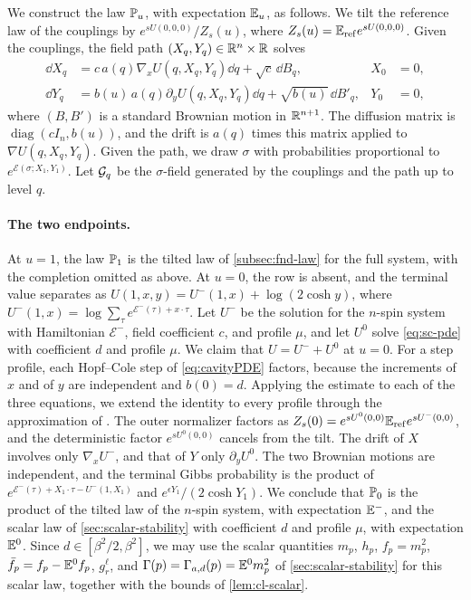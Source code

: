 We construct the law $\mathbb P_u$, with expectation $\mathbb E_u$, as follows. We
tilt the reference law of the couplings by $e^{sU(0,0,0)}/Z_s(u)$,
where $Z_s(u)=\mathbb E_{\rm ref}e^{sU(0,0,0)}$. Given the couplings, the field
path $(X_q,Y_q)\in\mathbb R^n\times\mathbb R$ solves
\[
 \begin{aligned}
 \dd X_q&=c\,a(q)\nabla_xU(q,X_q,Y_q)\dd q+\sqrt c\,\dd B_q,
 &X_0&=0,\\
 \dd Y_q&=b(u)\,a(q)\partial_yU(q,X_q,Y_q)\dd q+\sqrt{b(u)}\,\dd B'_q,
 &Y_0&=0,
 \end{aligned}
\]
where $(B,B')$ is a standard Brownian motion in $\mathbb R^{n+1}$. The diffusion
matrix is $\operatorname{diag}(cI_n,b(u))$, and the drift is $a(q)$
times this matrix applied to $\nabla U(q,X_q,Y_q)$. Given the path,
we draw $\sigma$ with probabilities proportional to
$e^{\mathcal E(\sigma;X_1,Y_1)}$. Let $\mathcal G_q$ be the $\sigma$-field
generated by the couplings and the path up to level $q$.

\paragraph{The two endpoints.}
At $u=1$, the law $\mathbb P_1$ is the tilted law of \cref{subsec:fnd-law} for
the full system, with the completion omitted as above. At $u=0$, the row
is absent, and the terminal value separates as
$U(1,x,y)=U^-(1,x)+\log(2\cosh y)$, where
$U^-(1,x)=\log\sum_\tau e^{\mathcal E^-(\tau)+x\cdot\tau}$. Let $U^-$ be
the solution for the $n$-spin system with Hamiltonian $\mathcal E^-$,
field coefficient $c$, and profile $\mu$, and let $U^0$ solve
\eqref{eq:sc-pde} with coefficient $d$ and profile $\mu$. We claim that
$U=U^-+U^0$ at $u=0$. For a step profile, each Hopf--Cole step of
\eqref{eq:cavityPDE} factors, because the increments of $x$ and of $y$
are independent and $b(0)=d$. Applying the estimate \cite[(2.19)]{AL} to
each of the three equations, we extend the identity to every profile
through the approximation of \cite[Section~2.6]{AL}. The outer normalizer
factors as $Z_s(0)=e^{sU^0(0,0)}\mathbb E_{\rm ref}e^{sU^-(0,0)}$, and the
deterministic factor $e^{sU^0(0,0)}$ cancels from the tilt. The drift of
$X$ involves only $\nabla_xU^-$, and that of $Y$ only $\partial_yU^0$.
The two Brownian motions are independent, and the terminal Gibbs
probability is the product of
$e^{\mathcal E^-(\tau)+X_1\cdot\tau-U^-(1,X_1)}$ and
$e^{\epsilon Y_1}/(2\cosh Y_1)$. We conclude that $\mathbb P_0$ is the product
of the tilted law of the $n$-spin system, with expectation $\mathbb E^-$, and
the scalar law of \cref{sec:scalar-stability} with coefficient $d$ and
profile $\mu$, with expectation $\mathbb E^0$. Since $d\in[\beta^2/2,\beta^2]$,
we may use the scalar quantities $m_p$, $h_p$, $f_p=m_p^2$, $\bar f_p=f_p-\mathbb E^0f_p$,
$g_r^\ell$, and $\Gamma(p)=\Gamma_{a,d}(p)=\mathbb E^0m_p^2$ of
\cref{sec:scalar-stability} for this scalar law, together
with the bounds of \cref{lem:cl-scalar}.

